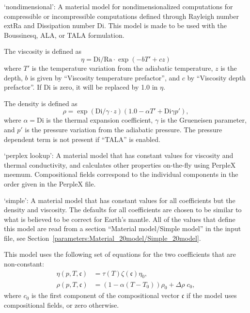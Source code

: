 \begin{itemize}
`nondimensional': A material model for nondimensionalized computations for compressible or incompressible computations defined through Rayleigh number 	ext{Ra} and Dissipation number Di. This model is made to be used with the Boussinesq, ALA, or TALA formulation.

The viscosity is defined as \[\eta = \text{Di} / \text{Ra} \cdot \exp(-b T' + c z)\] where $T'$ is the temperature variation from the adiabatic temperature, $z$ is the depth, $b$ is given by ``Viscosity temperature prefactor'', and $c$ by ``Viscosity depth prefactor''. If $\text{Di}$ is zero, it will be replaced by 1.0 in $\eta$.

The density is defined as \[\rho = \exp(\text{Di}/\gamma \cdot z)  (1.0 - \alpha T' + \text{Di} \gamma p'),\] where $\alpha=\text{Di}$ is the thermal expansion coefficient, $\gamma$ is the Grueneisen parameter, and $p'$ is the pressure variation from the adiabatic pressure. The pressure dependent term is not present if ``TALA'' is enabled.

`perplex lookup': A material model that has constant values for viscosity and thermal conductivity, and calculates other properties on-the-fly using PerpleX meemum. Compositional fields correspond to the individual components in the order given in the PerpleX file.

`simple': A material model that has constant values for all coefficients but the density and viscosity. The defaults for all coefficients are chosen to be similar to what is believed to be correct for Earth's mantle. All of the values that define this model are read from a section ``Material model/Simple model'' in the input file, see Section~\ref{parameters:Material_20model/Simple_20model}.

This model uses the following set of equations for the two coefficients that are non-constant: \begin{align}  \eta(p,T,\mathfrak c) &= \tau(T) \zeta(\mathfrak c) \eta_0, \\  \rho(p,T,\mathfrak c) &= \left(1-\alpha (T-T_0)\right)\rho_0 + \Delta\rho \; c_0,\end{align}where $c_0$ is the first component of the compositional vector $\mathfrak c$ if the model uses compositional fields, or zero otherwise. 


\end{itemize}
